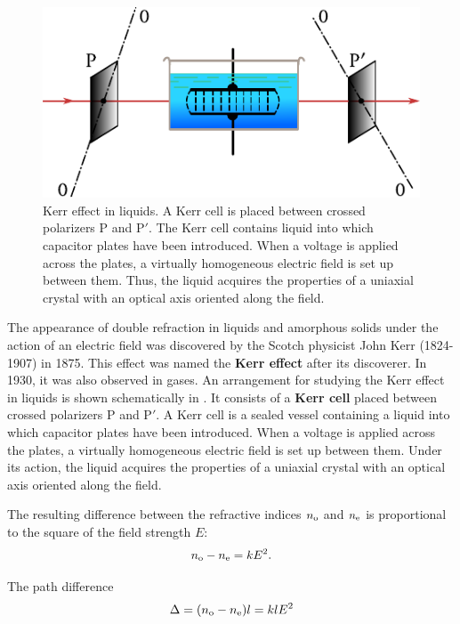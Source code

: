 \begin{figure}[t]
	\begin{center}
		\includegraphics[scale=1]{figures/ch_19/fig_19_20.pdf}
		\caption[]{Kerr effect in liquids. A Kerr cell is placed between crossed polarizers P and P$'$. The Kerr cell contains liquid into which capacitor plates have been introduced. When a voltage is applied across the plates, a virtually homogeneous electric field is set up between them. Thus, the liquid acquires the properties of a uniaxial crystal with an optical axis oriented along the field.}
		\label{fig:19_20}
	\end{center}
	\vspace{-0.8cm}
\end{figure}

The appearance of double refraction in liquids and amorphous solids under the action of an electric field was discovered by the Scotch physicist John Kerr (1824-1907) in 1875.
This effect was named the \textbf{Kerr effect} after its discoverer.
In 1930, it was also observed in gases.
An arrangement for studying the Kerr effect in liquids is shown schematically in .
It consists of a \textbf{Kerr cell} placed between crossed polarizers P and P$'$.
A Kerr cell is a sealed vessel containing a liquid into which capacitor plates have been introduced.
When a voltage is applied across the plates, a virtually homogeneous electric field is set up between them.
Under its action, the liquid acquires the properties of a uniaxial crystal with an optical axis oriented along the field.

The resulting difference between the refractive indices $n_{\text{o}}$ and $n_{\text{e}}$ is proportional to the square of the field strength $E$:
\begin{equation}\label{eq:19_20}
	n_{\text{o}} - n_{\text{e}} = k E^2.
\end{equation}

\noindent
The path difference
\begin{equation*}
	\Delta = (n_{\text{o}} - n_{\text{e}}) l = k l E^2
\end{equation*}

